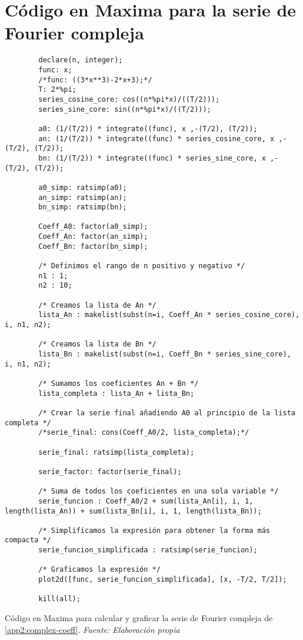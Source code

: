 \section{Código en Maxima para la serie de Fourier compleja}\label{app3:complex-code-maxima}
\begin{longlisting}
	\begin{verbatim}
		declare(n, integer);
		func: x;
		/*func: ((3*x**3)-2*x+3);*/
		T: 2*%pi;
		series_cosine_core: cos((n*%pi*x)/((T/2)));
		series_sine_core: sin((n*%pi*x)/((T/2)));
		
		a0: (1/(T/2)) * integrate((func), x ,-(T/2), (T/2));
		an: (1/(T/2)) * integrate((func) * series_cosine_core, x ,-(T/2), (T/2));
		bn: (1/(T/2)) * integrate((func) * series_sine_core, x ,-(T/2), (T/2));
		
		a0_simp: ratsimp(a0);
		an_simp: ratsimp(an);
		bn_simp: ratsimp(bn);
		
		Coeff_A0: factor(a0_simp);
		Coeff_An: factor(an_simp);
		Coeff_Bn: factor(bn_simp);
		
		/* Definimos el rango de n positivo y negativo */
		n1 : 1;
		n2 : 10;
		
		/* Creamos la lista de An */
		lista_An : makelist(subst(n=i, Coeff_An * series_cosine_core), i, n1, n2);
		
		/* Creamos la lista de Bn */
		lista_Bn : makelist(subst(n=i, Coeff_Bn * series_sine_core), i, n1, n2);
		
		/* Sumamos los coeficientes An + Bn */
		lista_completa : lista_An + lista_Bn;
		
		/* Crear la serie final añadiendo A0 al principio de la lista completa */
		/*serie_final: cons(Coeff_A0/2, lista_completa);*/
		
		serie_final: ratsimp(lista_completa);
		
		serie_factor: factor(serie_final);
		
		/* Suma de todos los coeficientes en una sola variable */
		serie_funcion : Coeff_A0/2 + sum(lista_An[i], i, 1, length(lista_An)) + sum(lista_Bn[i], i, 1, length(lista_Bn));
		
		/* Simplificamos la expresión para obtener la forma más compacta */
		serie_funcion_simplificada : ratsimp(serie_funcion);
		
		/* Graficamos la expresión */
		plot2d([func, serie_funcion_simplificada], [x, -T/2, T/2]);
		
		kill(all);	
	\end{verbatim}
	\caption[Código en Maxima para calcular y graficar la serie de Fourier compleja de \ref{app2:complex-coeff}.] {Código en Maxima para calcular y graficar la serie de Fourier compleja de \ref{app2:complex-coeff}. \textit{Fuente: Elaboración propia}} 
\end{longlisting}


